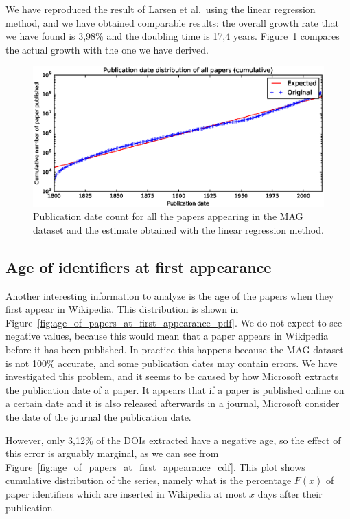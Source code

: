 We have reproduced the result of Larsen et al.\ using the linear regression method, and we have obtained comparable results: the overall growth rate that we have found is 3,98\% and the doubling time is 17,4 years.
Figure~\ref{fig:publication_date_regression} compares the actual growth with the one we have derived.

\begin{figure}[h]
\centering
\includegraphics[keepaspectratio=true, width=\textwidth]{assets/publication_date_regression}
\caption{Publication date count for all the papers appearing in the \ac{MAG} dataset and the estimate obtained with the linear regression method.}
\label{fig:publication_date_regression}
\end{figure}

\subsection{Age of identifiers at first appearance}
Another interesting information to analyze is the age of the papers when they first appear in Wikipedia.
This distribution is shown in Figure~\ref{fig:age_of_papers_at_first_appearance_pdf}.
We do not expect to see negative values, because this would mean that a paper appears in Wikipedia before it has been published.
In practice this happens because the \ac{MAG} dataset is not 100\% accurate, and some publication dates may contain errors.
We have investigated this problem, and it seems to be caused by how Microsoft extracts the publication date of a paper.
It appears that if a paper is published online on a certain date and it is also released afterwards in a journal, Microsoft consider the date of the journal the publication date.

However, only 3,12\% of the \acp{DOI} extracted have a negative age, so the effect of this error is arguably marginal, as we can see from Figure~\ref{fig:age_of_papers_at_first_appearance_cdf}.
This plot shows cumulative distribution of the series, namely what is the percentage $F(x)$ of paper identifiers which are inserted in Wikipedia at most $x$ days after their publication.

